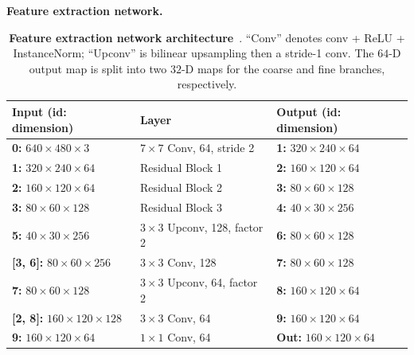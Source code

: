 \begin{enrichment}
\begin{enrichment}
     \vspace{0.4em}
     \noindent\textbf{Feature extraction network.}
     \begin{table}[H]
         \centering
         \begin{tabular}{l|l|l}
             \hline
             \textbf{Input (id: dimension)} & \textbf{Layer} & \textbf{Output (id: dimension)} \\
             \hline
             \textbf{0:} $640 \times 480 \times 3$ & $7 \times 7$ Conv, 64, stride 2 & \textbf{1:} $320 \times 240 \times 64$ \\
             \textbf{1:} $320 \times 240 \times 64$ & Residual Block 1 & \textbf{2:} $160 \times 120 \times 64$ \\
             \textbf{2:} $160 \times 120 \times 64$ & Residual Block 2 & \textbf{3:} $80 \times 60 \times 128$ \\
             \textbf{3:} $80 \times 60 \times 128$ & Residual Block 3 & \textbf{4:} $40 \times 30 \times 256$ \\
             \textbf{5:} $40 \times 30 \times 256$ & $3 \times 3$ Upconv, 128, factor 2 & \textbf{6:} $80 \times 60 \times 128$ \\
             \textbf{[3, 6]:} $80 \times 60 \times 256$ & $3 \times 3$ Conv, 128 & \textbf{7:} $80 \times 60 \times 128$ \\
             \textbf{7:} $80 \times 60 \times 128$ & $3 \times 3$ Upconv, 64, factor 2 & \textbf{8:} $160 \times 120 \times 64$ \\
             \textbf{[2, 8]:} $160 \times 120 \times 128$ & $3 \times 3$ Conv, 64 & \textbf{9:} $160 \times 120 \times 64$ \\
             \textbf{9:} $160 \times 120 \times 64$ & $1 \times 1$ Conv, 64 & \textbf{Out:} $160 \times 120 \times 64$ \\
             \hline
         \end{tabular}
         \caption{\textbf{Feature extraction network architecture}~\cite{wang2021_ibrnet}. ``Conv'' denotes conv + ReLU + InstanceNorm; ``Upconv'' is bilinear upsampling then a stride-1 conv. The $64$-D output map is split into two $32$-D maps for the coarse and fine branches, respectively.}
         \label{tab:chapter23_ibrnet_feat_extractor}
     \end{table}
     

\end{enrichment}
\end{enrichment}
